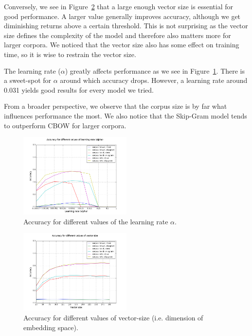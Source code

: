 \documentclass[conference]{IEEEtran}
\begin{document}
Conversely, we see in Figure~\ref{fig:size} that a large enough vector size is essential for good performance.
A larger value generally improves accuracy, although we get diminishing returns above a certain threshold.
This is not surprising as the vector size defines the complexity of the model and therefore also matters more for larger corpora.
We noticed that the vector size also has some effect on training time, so it is wise to restrain the vector size.

The learning rate ($\alpha$) greatly affects performance as we see in Figure~\ref{fig:alpha}.
There is a sweet-spot for $\alpha$ around which accuracy drops.
However, a learning rate around 0.031 yields good results for every model we tried.

From a broader perspective, we observe that the corpus size is by far what influences performance the most.
We also notice that the Skip-Gram model tends to outperform CBOW for larger corpora.

\begin{figure}[t]
\centering
\includegraphics[width=0.5\textwidth]{graph_acc_alpha}
\caption{Accuracy for different values of the learning rate $\alpha$. }
\label{fig:alpha}
\end{figure}

\begin{figure}[t]
\centering
\includegraphics[width=0.5\textwidth]{graph_acc_size}
\caption{Accuracy for different values of vector-size (i.e. dimension of embedding space). }
\label{fig:size}
\end{figure}
\end{document}
